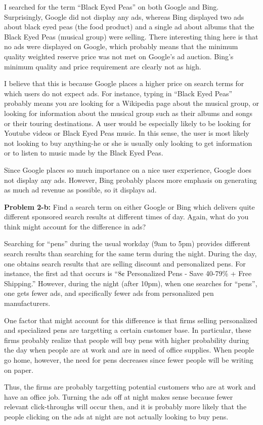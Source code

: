 \documentclass[psamsfonts]{amsart}
\newenvironment{sol}{\vspace{0.25cm}{\large \bfseries Solution:}}{\qedsymbol}
\newenvironment{prob}[1]{\begin{framed}{\large \bfseries Problem #1:}}{\end{framed}}
\begin{document}
\begin{sol}
I searched for the term ``Black Eyed Peas'' on both Google and Bing. Surprisingly, Google did not display any ads, whereas Bing displayed two ads about black eyed peas (the food product) and a single ad about albums that the Black Eyed Peas (musical group) were selling. There interesting thing here is that no ads were displayed on Google, which probably means that the minimum quality weighted reserve price was not met on Google's ad auction. Bing's minimum quality and price requirement are clearly not as high. 

I believe that this is because Google places a higher price on search terms for which users do not expect ads. For instance, typing in ``Black Eyed Peas'' probably means you are looking for a Wikipedia page about the musical group, or looking for information about the musical group such as their albums and songs or their touring destinations. A user would be especially likely to be looking for Youtube videos or Black Eyed Peas music. In this sense, the user is most likely not looking to buy anything-he or she is usually only looking to get information or to listen to music made by the Black Eyed Peas.

Since Google places so much importance on a nice user experience, Google does not display any ads. However, Bing probably places more emphasis on generating as much ad revenue as possible, so it displays ad.
\end{sol}

\begin{prob}{2-b}
Find a search term on either Google or Bing which delivers quite different sponsored search results at different times of day. Again, what do you think might account for the difference in ads?
\end{prob}
\begin{sol}
Searching for ``pens'' during the usual workday (9am to 5pm) provides different search results than searching for the same term during the night. During the day, one obtains search results that are selling discount and personalized pens. For instance, the first ad that occurs is ``8¢ Personalized Pens - Save 40-79\% + Free Shipping.'' However, during the night (after 10pm), when one searches for ``pens'', one gets fewer ads, and specifically fewer ads from personalized pen manufacturers.

One factor that might account for this difference is that firms selling personalized and specialized pens are targetting a certain customer base. In particular, these firms probably realize that people will buy pens with higher probability during the day when people are at work and are in need of office supplies. When people go home, however, the need for pens decreases since fewer people will be writing on paper. 

Thus, the firms are probably targetting potential customers who are at work and have an office job. Turning the ads off at night makes sense because fewer relevant click-throughs will occur then, and it is probably more likely that the people clicking on the ads at night are not actually looking to buy pens. 
\end{sol}
\end{document}
